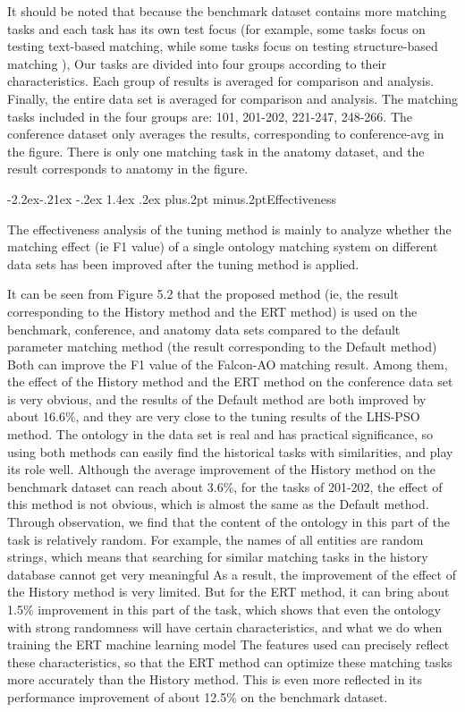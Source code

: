 \documentclass[twoside]{article}
\makeatletter
\def\subsubsection{\@startsection{subsubsection}{3}{\z@}%
 {-2.2ex\@plus -.21ex \@minus -.2ex}%
 {1.4ex \@plus.2ex}
{\normalfont\normalsize\protect\baselineskip=12pt plus.2pt minus.2pt\sl}}
\makeatother
\begin{document}
\begin{multicols}{2}
It should be noted that because the benchmark dataset contains more matching tasks and each task has its own test focus (for example, some tasks focus on testing text-based matching, while some tasks focus on testing structure-based matching ), Our tasks are divided into four groups according to their characteristics. Each group of results is averaged for comparison and analysis. Finally, the entire data set is averaged for comparison and analysis. 
The matching tasks included in the four groups are: 101, 201-202, 221-247, 248-266. The conference dataset only averages the results, corresponding to conference-avg in the figure. There is only one matching task in the anatomy dataset, and the result corresponds to anatomy in the figure.

\subsubsection{Effectiveness}

The effectiveness analysis of the tuning method is mainly to analyze whether the matching effect (ie F1 value) of a single ontology matching system on different data sets has been improved after the tuning method is applied.

It can be seen from Figure 5.2 that the proposed method (ie, the result corresponding to the History method and the ERT method) is used on the benchmark, conference, and anatomy data sets compared to the default parameter matching method (the result corresponding to the Default method) Both can improve the F1 value of the Falcon-AO matching result. 
Among them, the effect of the History method and the ERT method on the conference data set is very obvious, and the results of the Default method are both improved by about 16.6\%, and they are very close to the tuning results of the LHS-PSO method. The ontology in the data set is real and has practical significance, so using both methods can easily find the historical tasks with similarities, and play its role well. 
Although the average improvement of the History method on the benchmark dataset can reach about 3.6\%, for the tasks of 201-202, the effect of this method is not obvious, which is almost the same as the Default method. 
Through observation, we find that the content of the ontology in this part of the task is relatively random. For example, the names of all entities are random strings, which means that searching for similar matching tasks in the history database cannot get very meaningful As a result, the improvement of the effect of the History method is very limited. 
But for the ERT method, it can bring about 1.5\% improvement in this part of the task, which shows that even the ontology with strong randomness will have certain characteristics, and what we do when training the ERT machine learning model The features used can precisely reflect these characteristics, so that the ERT method can optimize these matching tasks more accurately than the History method. 
This is even more reflected in its performance improvement of about 12.5\% on the benchmark dataset.


\end{multicols}
\end{document}
